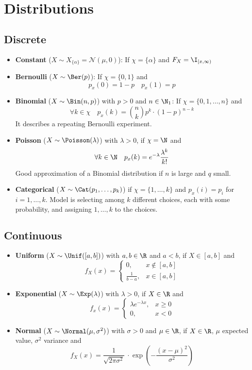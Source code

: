\section{Distributions}
\subsection{Discrete}
\begin{itemize}
  \item \textbf{Constant} (\(X \sim X_{\{\alpha\}} = \mathcal{N}(\mu, 0)\)): If \(\chi = \{\alpha\}\) and \(F_X = \I_{[x, \infty)}\)
  \item \textbf{Bernoulli} (\(X \sim \Ber(p)\)): If \(\chi = \{0, 1\}\) and
  \[p_x(0) = 1 - p \quad p_x(1) = p\]

  \item \textbf{Binomial} (\(X \sim \Bin(n, p)\)) with \(p > 0\) and \(n \in \N_1\): If \(\chi = \{0, 1, \ldots, n\}\) and
  \[\forall k \in \chi \quad p_x(k) = \binom{n}{k} p^k \cdot (1 - p)^{n -k}\]
  It describes a repeating Bernoulli experiment.

  \item \textbf{Poisson} (\(X \sim \Poisson(\lambda)\)) with \(\lambda > 0\), if \(\chi = \N\) and
  \[\forall k \in \N \quad p_x(k) = e^{-\lambda} \frac{\lambda^k}{k!}\]
  Good approximation of a Binomial distribution if \(n\) is large and \(q\) small.

  \item \textbf{Categorical} (\(X \sim \Cat(p_1, \ldots, p_k)\)) if \(\chi = \{1, \ldots, k\}\) and \(p_x(i) = p_i\) for \(i = 1, \ldots, k\). Model is selecting among \(k\) different choices, each with some probability, and assigning \(1, \ldots, k\) to the choices.
\end{itemize}


\subsection{Continuous}
\begin{itemize}
  \item \textbf{Uniform} (\(X \sim \Unif([a, b])\)) with \(a, b \in \R\) and \(a < b\), if \(X \in [a, b]\) and
  \[f_X(x) = \begin{cases}
    0, & x \notin [a, b] \\
    \frac{1}{b - a}, & x \in [a, b]
  \end{cases}\]

  \item \textbf{Exponential} (\(X \sim \Exp(\lambda)\)) with \(\lambda > 0\), if \(X \in \R\) and
  \[f_x(x) = \begin{cases}
    \lambda e^{-\lambda x}, & x \geq 0 \\
    0, & x < 0
  \end{cases}\]

  \item \textbf{Normal} (\(X \sim \Normal(\mu, \sigma^2)\)) with \(\sigma > 0\) and \(\mu \in \R\), if \(X \in \R\), \(\mu\) expected value, \(\sigma^2\) variance and
  \[f_X(x) = \frac{1}{\sqrt{2 \pi \sigma^2}}\ \cdot \exp(-\frac{(x - \mu)^2}{\sigma^2})\]
\end{itemize}